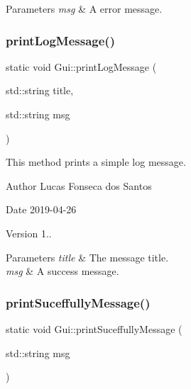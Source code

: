 \begin{DoxyParams}{Parameters}
{\em msg} & A error message. \\
\hline
\end{DoxyParams}
\mbox{\label{classGui_ad2532ed126d799538a1ee30c2d5ec9ac}} 
\subsubsection{\texorpdfstring{print\+Log\+Message()}{printLogMessage()}}
{\footnotesize\ttfamily static void Gui\+::print\+Log\+Message (\begin{DoxyParamCaption}\item[{std\+::string}]{title,  }\item[{std\+::string}]{msg }\end{DoxyParamCaption})\hspace{0.3cm}{\ttfamily [static]}}

This method prints a simple log message. \begin{DoxyAuthor}{Author}
Lucas Fonseca dos Santos 
\end{DoxyAuthor}
\begin{DoxyDate}{Date}
2019-\/04-\/26 
\end{DoxyDate}
\begin{DoxyVersion}{Version}
1..
\end{DoxyVersion}

\begin{DoxyParams}{Parameters}
{\em title} & The message title. \\
\hline
{\em msg} & A success message. \\
\hline
\end{DoxyParams}
\mbox{\label{classGui_ac71b24eae15306196c84bf2cbf3281a0}} 
\subsubsection{\texorpdfstring{print\+Suceffully\+Message()}{printSuceffullyMessage()}}
{\footnotesize\ttfamily static void Gui\+::print\+Suceffully\+Message (\begin{DoxyParamCaption}\item[{std\+::string}]{msg }\end{DoxyParamCaption})\hspace{0.3cm}{\ttfamily [static]}}

